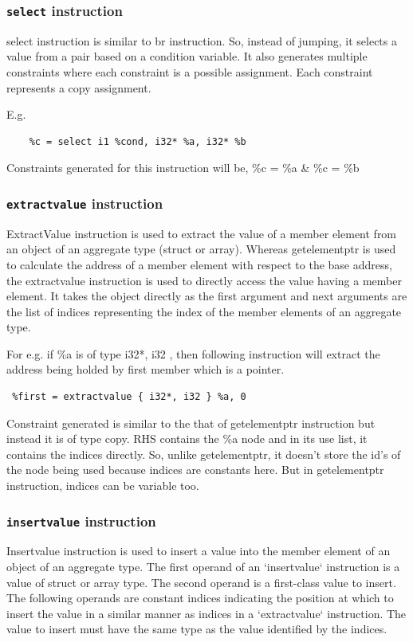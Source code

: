 \documentclass[a4paper,12pt]{report}
\begin{document}
\subsubsection{\texttt{select} instruction}
select instruction is similar to br instruction. So, instead of jumping, it
selects a value from a pair based on a condition variable. It also generates 
multiple constraints where each constraint is a possible assignment. Each 
constraint represents a copy assignment.

E.g.
\begin{lstlisting}
    %c = select i1 %cond, i32* %a, i32* %b
\end{lstlisting}

Constraints generated for this instruction will be, \%c = \%a \& \%c = \%b

\subsubsection{\texttt{extractvalue} instruction}
ExtractValue instruction is used to extract the value of a member element from 
an object of an aggregate type (struct or array). Whereas getelementptr is used 
to calculate the address of a member element with respect to the base address, 
the extractvalue instruction is used to directly access the value having a 
member element. It takes the object directly as the first argument and next 
arguments are the list of indices representing the index of the member 
elements of an aggregate type.

For e.g. if \%a is of type { i32*, i32 }, then 
following instruction will extract the address being holded by first member 
which is a pointer.

\begin{lstlisting}
 %first = extractvalue { i32*, i32 } %a, 0
\end{lstlisting}

Constraint generated is similar to the that of getelementptr instruction but 
instead it is of type copy. RHS contains the \%a node and in its use list, it 
contains the indices directly. So, unlike getelementptr, it doesn't store the 
id's of the node being used because indices are constants here. But in 
getelementptr instruction, indices can be variable too.

\subsubsection{\texttt{insertvalue} instruction}
Insertvalue instruction is used to insert a value into the member element of an 
object of an aggregate type.
The first operand of an ‘insertvalue‘ instruction is a value of struct or array 
type. The second operand is a first-class value to insert. The following 
operands are constant indices indicating the position at which to insert the 
value in a similar manner as indices in a ‘extractvalue‘ instruction. The value 
to insert must have the same type as the value identified by the indices.
\end{document}
